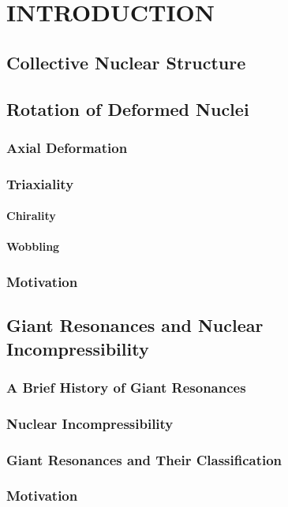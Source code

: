 %
%

\chapter{INTRODUCTION}
\label{chp:intro}

\section{Collective Nuclear Structure}
\label{sec:intro-coll-ns}

\section{Rotation of Deformed Nuclei}
\label{sec:intro-rot-def-nuc}

\subsection{Axial Deformation}
\label{ssec:intro-rot-axial-def}

\subsection{Triaxiality}
\label{ssec:intro-rot-triax}

\subsubsection{Chirality}
\label{sssec:intro-rot-chiral}

\subsubsection{Wobbling}
\label{sssec:intro-rot-wob}

\subsection{Motivation}
\label{ssec:intro-rot-motivation}


\section{Giant Resonances and Nuclear Incompressibility}
\label{sec:intro-gr-nuc-inc}


\subsection{A Brief History of Giant Resonances}
\label{ssec:intro-gr-brief-history}

\subsection{Nuclear Incompressibility}
\label{ssec:intro-gr-nuc-incomp}

\subsection{Giant Resonances and Their Classification}
\label{ssec:intro-gr-class}

\subsection{Motivation}
\label{ssec:intro-gr-mot}


